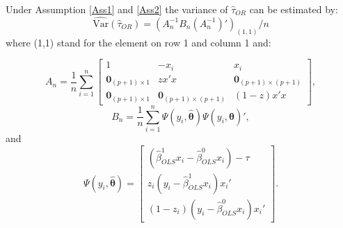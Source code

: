 \documentclass[11pt]{article}
\newcommand{\Var}{{\mbox{Var}}}
\begin{document}
\noindent Under Assumption \ref{Ass1} and \ref{Ass2} the variance of $\hat \tau_{OR}$ can be estimated by:
$$\widehat{\Var}(\hat{\tau}_{OR}) = (A_n^{-1} B_n (A_n^{-1})' )_{(1,1)}/ n$$
where (1,1) stand for the element on row 1 and column 1 and:


\begin{equation*}
A_n=\frac{1}{n}\sum \limits_{i =1}^n\left[
\begin{matrix}
1& -x_i &x_i \\
\boldsymbol 0_{(p+1)\times1}&zx' x& \boldsymbol 0_{(p+1)\times(p+1)}\\
\boldsymbol 0_{(p+1)\times1}&\boldsymbol 0_{(p+1)\times(p+1)}& (1-z)x' x
 \end{matrix} \right],
\end{equation*}
\begin{equation*}
B_n=\frac{1}{n}\sum \limits_{i =1}^n\Psi (y_i,  \boldsymbol{ \hat{\theta}})\Psi (y_i,  \boldsymbol{ \hat{\theta}})',
\end{equation*}
and
\begin{equation*}
\Psi (y_i,  \boldsymbol{ \hat{\theta}}) =\left[
\begin{matrix}
(\hat \beta^1_{OLS}x_i- \hat \beta^0_{OLS}x_i) - \tau \\
z_i(y_i- \hat \beta^1_{OLS}x_i) x_i' \\
(1-z_i)(y_i- \hat \beta^0_{OLS}x_i) x_i' 
\end{matrix} \right].
\end{equation*}
\vspace{2mm}
\end{document}
